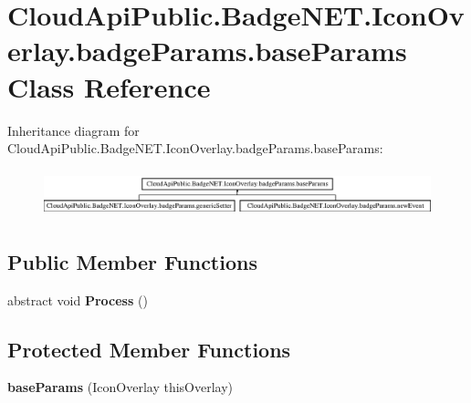 \hypertarget{class_cloud_api_public_1_1_badge_n_e_t_1_1_icon_overlay_1_1badge_params_1_1base_params}{\section{Cloud\-Api\-Public.\-Badge\-N\-E\-T.\-Icon\-Overlay.\-badge\-Params.\-base\-Params Class Reference}
\label{class_cloud_api_public_1_1_badge_n_e_t_1_1_icon_overlay_1_1badge_params_1_1base_params}
}
Inheritance diagram for Cloud\-Api\-Public.\-Badge\-N\-E\-T.\-Icon\-Overlay.\-badge\-Params.\-base\-Params\-:\begin{figure}[H]
\begin{center}
\leavevmode
\includegraphics[height=1.379310cm]{class_cloud_api_public_1_1_badge_n_e_t_1_1_icon_overlay_1_1badge_params_1_1base_params}
\end{center}
\end{figure}
\subsection*{Public Member Functions}
\begin{DoxyCompactItemize}
\item 
\hypertarget{class_cloud_api_public_1_1_badge_n_e_t_1_1_icon_overlay_1_1badge_params_1_1base_params_a084f9980a716a2fc9e3932e9793444f6}{abstract void {\bfseries Process} ()}\label{class_cloud_api_public_1_1_badge_n_e_t_1_1_icon_overlay_1_1badge_params_1_1base_params_a084f9980a716a2fc9e3932e9793444f6}

\end{DoxyCompactItemize}
\subsection*{Protected Member Functions}
\begin{DoxyCompactItemize}
\item 
\hypertarget{class_cloud_api_public_1_1_badge_n_e_t_1_1_icon_overlay_1_1badge_params_1_1base_params_a528fb20815aa0c5ef63d488c4fbfb2b0}{{\bfseries base\-Params} (Icon\-Overlay this\-Overlay)}\label{class_cloud_api_public_1_1_badge_n_e_t_1_1_icon_overlay_1_1badge_params_1_1base_params_a528fb20815aa0c5ef63d488c4fbfb2b0}

\end{DoxyCompactItemize}
